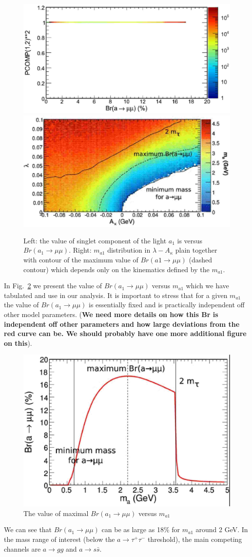 \documentclass[aps,12pt,superscriptaddress,nofootinbib,floatfix,showpacs]{revtex4}
\begin{document}
\begin{figure}[htb]
\begin{center}
\includegraphics[width=0.5\linewidth]{plots/pcomp13_vs_br_a-mm.eps}%
\includegraphics[width=0.5\linewidth]{plots/lam_vs_akap_ma.eps}
\caption{Left: the value of  singlet
component of the light  $a_1$ is versus $Br(a_1\to\mu\mu)$.
Right: $m_{a1}$ distribution
in $\lambda-A_\kappa$ plain together with contour of the maximum value of
$Br(a1\to \mu\mu)$ (dashed contour) 
which depends only on the kinematics defined by the $m_{a1}$.
\label{pcomp13_vs_br_a-mm}}
\end{center}
\end{figure}

In Fig.~\ref{br-h-aa_vs_ma} we present the  value 
of  $Br(a_1\to\mu\mu)$ versus $m_{a1}$ which
we have tabulated and use in our analysis. 
It is important to stress that for a given $m_{a1}$
the value of  $Br(a_1\to\mu\mu)$ is essentially fixed
and is practically independent off other model parameters.
({\bf We need more details on 
how this  Br is independent off other parameters
and how large deviations 
from the red curve can be. We should probably have
one more additional figure on this}).
\begin{figure}[htb]
\includegraphics[width=0.75\linewidth]{plots/br-h-aa_vs_ma.eps}%
\caption{The  value 
of maximal  $Br(a_1\to\mu\mu)$ versus $m_{a1}$ 
\label{br-h-aa_vs_ma}}
\end{figure}
We can see that $Br(a_1\to\mu\mu)$ can be as large as 18\%
for $m_{a1}$ around 2 GeV.
In the mass
range of interest (below the $a \to \tau^+\tau^-$ threshold), the main
competing channels are $a \to gg$ and $a \to s\bar{s}$.
\end{document}
